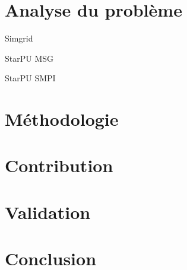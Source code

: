 \documentclass[11pt,xcolor=dvipsnames,presentation]{beamer}
\begin{document}
\section{Analyse du problème}
\label{sec-4}
\begin{frame}[label=sec-4-1]{Simgrid}
\end{frame}
\begin{frame}[label=sec-4-2]{StarPU MSG}
\end{frame}
\begin{frame}[label=sec-4-3]{StarPU SMPI}
\end{frame}

\section{Méthodologie}
\label{sec-5}
\section{Contribution}
\label{sec-6}
\section{Validation}
\label{sec-7}
\section{Conclusion}
\label{sec-8}
\end{document}
